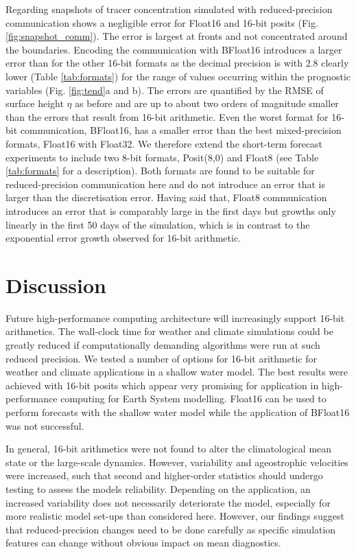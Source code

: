Regarding snapshots of tracer concentration simulated with reduced-precision communication shows a negligible error for Float16 and
16-bit posits (Fig. \ref{fig:snapshot_comm}). The error is largest at fronts and not concentrated around the boundaries. Encoding the
communication with BFloat16 introduces a larger error than for the other 16-bit formats as the decimal precision is with 2.8 clearly lower
(Table \ref{tab:formats}) for the range of values occurring within the prognostic variables (Fig. \ref{fig:tend}a and b). The errors are quantified
by the RMSE of surface height $\eta$ as before and are up to about two orders of magnitude smaller than the errors that result from 16-bit arithmetic.
Even the worst format for 16-bit communication, BFloat16, has a smaller error than the best mixed-precision formats, Float16 with Float32.
We therefore extend the short-term forecast experiments to include two 8-bit formats, Posit(8,0) and Float8 (see Table \ref{tab:formats} for
a description). Both formats are found to be suitable for reduced-precision communication here and do not introduce an error that is larger than the
discretisation error. Having said that, Float8 communication introduces an error that is comparably large in the first days but growths only
linearly in the first 50 days of the simulation, which is in contrast to the exponential error growth observed for 16-bit arithmetic.

\section{Discussion}
\label{sec:swm_discussion}

Future high-performance computing architecture will increasingly support 16-bit arithmetics. The wall-clock time for weather and climate
simulations could be greatly reduced if computationally demanding algorithms were run at such reduced precision. We tested a number
of options for 16-bit arithmetic for weather and climate applications in a shallow water model. The best results were achieved with 16-bit
posits which appear very promising for application in high-performance computing for Earth System modelling. Float16 can be used to
perform forecasts with the shallow water model while the application of BFloat16 was not successful.

In general, 16-bit arithmetics were not found to alter the climatological mean state or the large-scale dynamics. However, 
variability and ageostrophic velocities were increased, such that second and higher-order statistics should undergo testing
to assess the models reliability. Depending on the application, an increased variability does not  necessarily deteriorate the
model, especially for more realistic model set-ups than considered here. However, our findings suggest that reduced-precision
changes need to be done carefully as specific simulation features can change without obvious impact on mean diagnostics.


